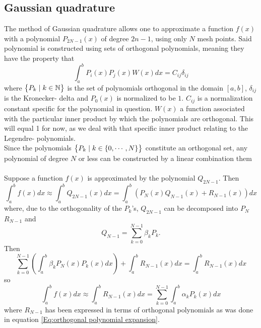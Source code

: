 \documentclass[10pt,a4paper]{article}
\begin{document}
\subsection{Gaussian quadrature}
The method of Gaussian quadrature allows one to approximate a function $f(x)$ with a polynomial $P_{2N-1}(x)$ of degree $2n-1$, using only $N$ mesh points. Said polynomial is constructed using sets of orthogonal polynomials, meaning they have the property that
\begin{equation}
\int_a^b P_i(x)P_j(x)W(x)dx = C_{ij}\delta_{ij}
\end{equation}
where $\big\{ P_k\hspace{1mm}|\hspace{1mm} k \in \mathbb N \big\}$ is the set of polynomials orthogonal in the domain $[a,b]$, $\delta_{ij}$ is the Kronecker- delta and $P_0(x)$ is normalized to be $1$. $C_{ij}$ is a normalization constant specific for the polynomial in question. $W(x)$ a function associated with the particular inner product by which the polynomials are orthogonal. This will equal 1 for now, as we deal with that specific inner product relating to the Legendre- polynomials.\\Since the polynomials $\big\{ P_k\hspace{1mm}|\hspace{1mm} k \in \{0,\cdots ,N\} \big\}$ constitute an orthogonal set, any polynomial of degree $N$ or less can be constructed by a linear combination them\\\\Suppose a function $f(x)$ is approximated by the polynomial $Q_{2N-1}$. Then
\begin{equation}\label{Eq:Poly approximation}
\int_{a}^bf(x)dx \approx \int_{a}^bQ_{2N-1}(x)dx=\int_{a}^b\left(P_N(x)Q_{N-1}(x)+R_{N-1}(x)\right)dx
\end{equation}
where, due to the orthogonality of the $P_k$'s, $Q_{2N-1}$ can be decomposed into $P_N$ $R_{N-1}$ and 
\begin{equation}\label{Eq:orthogonal polynomial expansion}
Q_{N-1} = \sum\limits_{k=0}^{N-1} \beta_k P_k.
\end{equation}
Then
$$
\sum\limits_{k=0}^{N-1} \left( \int_{a}^b \beta_k P_N(x) P_k(x)dx \right)+\int_{a}^bR_{N-1}(x)dx = \int_{a}^bR_{N-1}(x)dx
$$
so
\begin{equation*}
\int_{a}^bf(x)dx \approx \int_{a}^bR_{N-1}(x)dx = \sum\limits_{k=0}^{N-1}  \int_{a}^b \alpha_k P_k(x)dx
\end{equation*}
where $R_{N-1}$ has been expressed in terms of orthogonal polynomials as was done in equation \ref{Eq:orthogonal polynomial expansion}.
\end{document}
